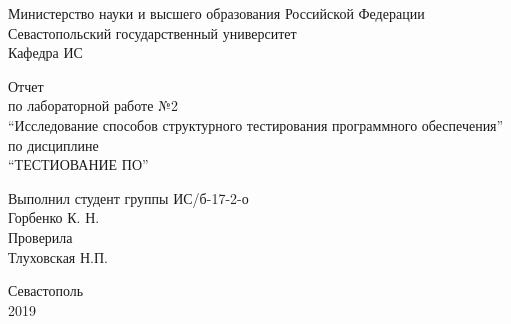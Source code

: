 \documentclass[a4paper,14pt]{extarticle}
\newcommand{\mylabnumber}{2}
\newcommand{\mylabtitle}{Исследование способов структурного
                            тестирования программного обеспечения}
\newcommand{\mysubject}{Тестиование ПО}
\newcommand{\mylecturer}{Тлуховская Н.П.}
\begin{document}
    \lstset{ %
        basicstyle=\footnotesize\ttfamily,
        breaklines=true,
        numbersep=5pt,
        tabsize=4,
        gobble=8,
        extendedchars=\true,
        keepspaces=\true,
        numbers=left,
        stringstyle=\ttfamily,
        showstringspaces=\false
    }


    \begin{titlepage}
        
        \thispagestyle{empty}
        
        \begin{center}
            
            Министерство науки и высшего образования Российской Федерации \\
            Севастопольский государственный университет \\
            Кафедра ИС
            
            \vfill

            Отчет \\
            по лабораторной работе №\mylabnumber \\
            \enquote{\mylabtitle} \\
            по дисциплине \\
            \enquote{\MakeTextUppercase{\mysubject}}

        \end{center}

        \vspace{1cm}

        \noindent\hspace{7.5cm} Выполнил студент группы ИС/б-17-2-о \\
        \null\hspace{7.5cm} Горбенко К. Н. \\
        \null\hspace{7.5cm} Проверила \\
        \null\hspace{7.5cm} \mylecturer

        \vfill

        \begin{center}
            Севастополь \\
            2019
        \end{center}

    \end{titlepage}
\end{document}
